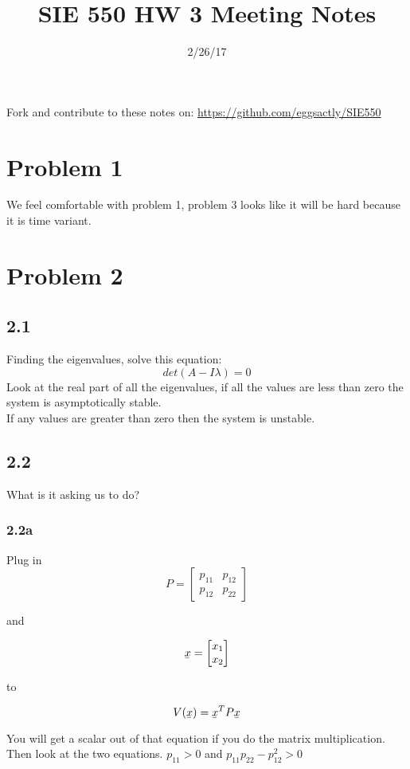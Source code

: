 \documentclass[12pt]{article}
\newcommand{\ubar}[1]{\underaccent{\bar}{#1}}
\begin{document}
\title{SIE 550 HW 3 Meeting Notes}
\date{2/26/17}

\maketitle

Fork and contribute to these notes on: \url{https://github.com/eggsactly/SIE550}

\section*{Problem 1} 
We feel comfortable with problem 1, problem 3 looks like it will be hard because it is time variant. 

\section*{Problem 2} 
\subsection*{2.1}
Finding the eigenvalues, solve this equation:
$$det(A-I\lambda)=0$$
Look at the real part of all the eigenvalues, if all the values are less than zero the system is asymptotically stable.\\
If any values are greater than zero then the system is unstable. 

\subsection*{2.2}
What is it asking us to do?

\subsubsection*{2.2a}
Plug in 
$$P=\begin{bmatrix} p_{11} & p_{12} \\
p_{12} & p_{22}
\end{bmatrix}$$ 

and 

$$\ubar{x}=\begin{bmatrix} x_{1} \\
x_{2}
\end{bmatrix}$$ 

to

$$V(\ubar{x})=\ubar{x}^TP\ubar{x}$$

You will get a scalar out of that equation if you do the matrix multiplication. Then look at the two equations. 
$p_{11}>0$ 
and
$p_{11}p_{22}-p_{12}^2>0$ \\
\end{document}
